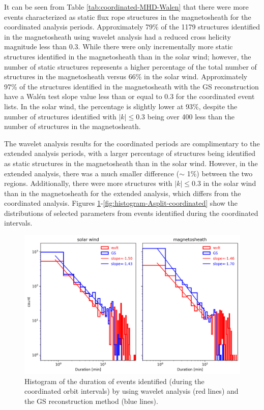\noindent It can be seen from Table \ref{tab:coordinated-MHD-Walen} that there were more events characterized as static flux rope structures in the magnetosheath for the coordinated analysis periods. Approximately 79\% of the 1179 structures identified in the magnetosheath using wavelet analysis had a reduced cross helicity magnitude less than 0.3. While there were only incrementally more static structures identified in the magnetosheath than in the solar wind; however, the number of static structures represents a higher percentage of the total number of structures in the magnetosheath versus 66\% in the solar wind. Approximately 97\% of the structures identified in the magnetosheath with the GS reconstruction have a Wal\'en test slope value less than or equal to 0.3 for the coordinated event lists. In the solar wind, the percentage is slightly lower at 93\%, despite the number of structures identified with $|k|\leq 0.3$ being over 400 less than the number of structures in the magnetosheath.

The wavelet analysis results for the coordinated periods are complimentary to the extended analysis periods, with a larger percentage of structures being identified as static structures in the magnetosheath than in the solar wind. However, in the extended analysis, there was a much smaller difference ($\sim$ 1\%) between the two regions. Additionally, there were more structures with $|k|\leq 0.3$ in the solar wind than in the magnetosheath for the extended analysis, which differs from the coordinated analysis. Figures \ref{fig:histogram-duration-coordinated}-\ref{fig:histogram-Asplit-coordinated} show the distributions of selected parameters from events identified during the coordinated intervals.

\begin{figure}
    \centering
    \includegraphics[width=\textwidth]{Figures/Histograms/duration_coordinated.png}
    \caption[Histogram of duration from coordinated analysis]{Histogram of the duration of events identified (during the coordinated orbit intervals) by using wavelet analysis (red lines) and the GS reconstruction method (blue lines).}
    \label{fig:histogram-duration-coordinated}
\end{figure}

